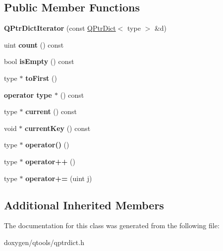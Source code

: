 \subsection*{Public Member Functions}
\begin{DoxyCompactItemize}
\item 
\mbox{\label{class_q_ptr_dict_iterator_a6ad02cc60356c93aaff407ed183ffecd}} 
{\bfseries Q\+Ptr\+Dict\+Iterator} (const \mbox{\hyperlink{class_q_ptr_dict}{Q\+Ptr\+Dict}}$<$ type $>$ \&d)
\item 
\mbox{\label{class_q_ptr_dict_iterator_a12800057411453f1373329964d6c2f88}} 
uint {\bfseries count} () const
\item 
\mbox{\label{class_q_ptr_dict_iterator_ab246775094da40856c94eba0d297a01b}} 
bool {\bfseries is\+Empty} () const
\item 
\mbox{\label{class_q_ptr_dict_iterator_a579251c87c9356f146285e666f6abec6}} 
type $\ast$ {\bfseries to\+First} ()
\item 
\mbox{\label{class_q_ptr_dict_iterator_a57f0e68d4b0d6849c4f33e9d5bf57332}} 
{\bfseries operator type $\ast$} () const
\item 
\mbox{\label{class_q_ptr_dict_iterator_a9236f74c9999be9ecc1ef4e91ba32f00}} 
type $\ast$ {\bfseries current} () const
\item 
\mbox{\label{class_q_ptr_dict_iterator_a820fd00a79d80796ed43b338eca273cb}} 
void $\ast$ {\bfseries current\+Key} () const
\item 
\mbox{\label{class_q_ptr_dict_iterator_a3cc590bb7d03a60652a02c3b9e3923ee}} 
type $\ast$ {\bfseries operator()} ()
\item 
\mbox{\label{class_q_ptr_dict_iterator_a74d0708ca0b2719f336bdc4aaa635f1a}} 
type $\ast$ {\bfseries operator++} ()
\item 
\mbox{\label{class_q_ptr_dict_iterator_a6f62f34c3702de4d25389a35ca1cf200}} 
type $\ast$ {\bfseries operator+=} (uint j)
\end{DoxyCompactItemize}
\subsection*{Additional Inherited Members}


The documentation for this class was generated from the following file\+:\begin{DoxyCompactItemize}
\item 
doxygen/qtools/qptrdict.\+h\end{DoxyCompactItemize}

